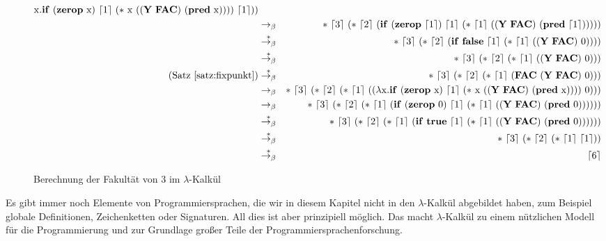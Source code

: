 \begin{figure}[!t]
\begin{center}
\begin{eqnarray*}
    \lrm x.\mathbf{if}~(\mathbf{zerop}~\lrm x)~\lceil 1\rceil~(\ast~\lrm x~((\mathbf{Y}~\mathbf{FAC})~(\mathbf{pred}~\lrm x))))~\lceil 1\rceil))\\
%
%
    &\rightarrow_{\beta}&
    \ast~\lceil 3\rceil~(\ast~\lceil 2\rceil~(\mathbf{if}~(\mathbf{zerop}~\lceil 1\rceil)~\lceil 1\rceil~(\ast~\lceil 1\rceil~((\mathbf{Y}~\mathbf{FAC})~(\mathbf{pred}~\lceil 1\rceil)))))\\
    &\overset{\ast}{\rightarrow_{\beta}}&
    \ast~\lceil 3\rceil~(\ast~\lceil 2\rceil~(\mathbf{if}~\mathbf{false}~\lceil 1\rceil~(\ast~\lceil 1\rceil~((\mathbf{Y}~\mathbf{FAC})~0))))\\
    &\overset{\ast}{\rightarrow_{\beta}}&
    \ast~\lceil 3\rceil~(\ast~\lceil 2\rceil~(\ast~\lceil 1\rceil~((\mathbf{Y}~\mathbf{FAC})~0)))\\
    \text{(Satz~\ref{satz:fixpunkt})} &\overset{\ast}{\rightarrow_{\beta}}&
    \ast~\lceil 3\rceil~(\ast~\lceil 2\rceil~(\ast~\lceil 1\rceil~(\mathbf{FAC}~(\mathbf{Y}~\mathbf{FAC})~0)))\\
    &\rightarrow_{\beta}&
    \ast~\lceil 3\rceil~(\ast~\lceil 2\rceil~(\ast~\lceil 1\rceil~((\lambda
    \lrm x.\mathbf{if}~(\mathbf{zerop}~\lrm x)~\lceil 1\rceil~(\ast~\lrm x~((\mathbf{Y}~\mathbf{FAC})~(\mathbf{pred}~\lrm x))))~0)))\\
%
%
    &\rightarrow_{\beta}&
    \ast~\lceil 3\rceil~(\ast~\lceil 2\rceil~(\ast~\lceil 1\rceil~(\mathbf{if}~(\mathbf{zerop}~0)~\lceil 1\rceil~(\ast~\lceil 1\rceil~((\mathbf{Y}~\mathbf{FAC})~(\mathbf{pred}~0))))))\\
    &\overset{\ast}{\rightarrow_{\beta}}&
    \ast~\lceil 3\rceil~(\ast~\lceil 2\rceil~(\ast~\lceil 1\rceil~(\mathbf{if}~\mathbf{true}~\lceil 1\rceil~(\ast~\lceil 1\rceil~((\mathbf{Y}~\mathbf{FAC})~(\mathbf{pred}~0))))))\\
    &\overset{\ast}{\rightarrow_{\beta}}&
    \ast~\lceil 3\rceil~(\ast~\lceil 2\rceil~(\ast~\lceil 1\rceil~\lceil 1\rceil))\\
    &\overset{\ast}{\rightarrow_{\beta}}&
    \lceil 6\rceil
    \end{eqnarray*}
    \caption{Berechnung der Fakultät von 3 im $\lambda$-Kalkül}
    \label{fig:fac3}
  \end{center}
\end{figure}

Es gibt immer noch Elemente von
Programmiersprachen, die wir in diesem Kapitel nicht in den
$\lambda$-Kalkül abgebildet haben, zum Beispiel globale Definitionen,
Zeichenketten oder
Signaturen.  All dies ist aber prinzipiell möglich.  Das macht
$\lambda$-Kalkül zu einem nützlichen Modell für die
Programmierung und zur Grundlage großer Teile der
Programmiersprachenforschung.

